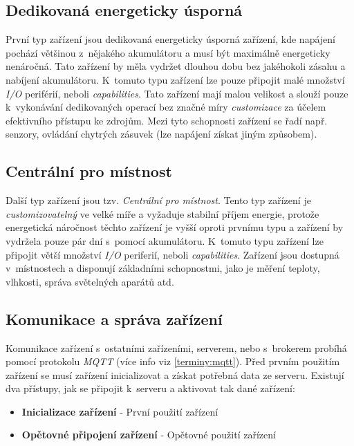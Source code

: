 \subsection*{Dedikovaná energeticky úsporná}
\label{hardware:usporna}
První typ zařízení jsou dedikovaná energeticky úsporná zařízení, kde napájení pochází většinou z~nějakého akumulátoru a musí být maximálně energeticky nenáročná.
Tato zařízení by měla vydržet dlouhou dobu bez jakéhokoli zásahu a nabíjení akumulátoru.
K~tomuto typu zařízení lze pouze připojit malé množství \emph{I/O} periférií, neboli \emph{capabilities}.
Tato zařízení mají malou velikost a slouží pouze k~vykonávání dedikovaných operací bez značné míry \emph{customizace} za účelem efektivního přístupu ke zdrojům.
Mezi tyto schopnosti zařízení se řadí např. senzory, ovládání chytrých zásuvek (lze napájení získat jiným způsobem).

\subsection*{Centrální pro místnost}
\label{hardware:centralni}
Další typ zařízení jsou tzv. \emph{Centrální pro místnost}.
Tento typ zařízení je \emph{customizovatelný} ve velké míře a vyžaduje stabilní příjem energie, protože energetická náročnost těchto zařízení je vyšší oproti prvnímu typu a zařízení by vydržela pouze pár dní s~pomocí akumulátoru.
K~tomuto typu zařízení lze připojit větší množství \emph{I/O} periferií, neboli \emph{capabilities}.
Zařízení jsou dostupná v~místnostech a disponují základními schopnostmi, jako je měření teploty, vlhkosti, správa světelných aparátů atd.

\newpage
\subsection*{Komunikace a správa zařízení}
\label{hardware:komunikace}

Komunikace zařízení s~ostatními zařízeními, serverem, nebo s~brokerem probíhá pomocí protokolu \emph{MQTT} (více info viz \ref{terminy:mqtt}).
Před prvním použitím zařízení se musí zařízení inicializovat a získat potřebná data ze serveru.
Existují dva přístupy, jak se připojit k~serveru a aktivovat tak dané zařízení:
\begin{itemize}
  \item \textbf{Inicializace zařízení} - První použití zařízení
  \item \textbf{Opětovné připojení zařízení} - Opětovné použití zařízení
\end{itemize}

